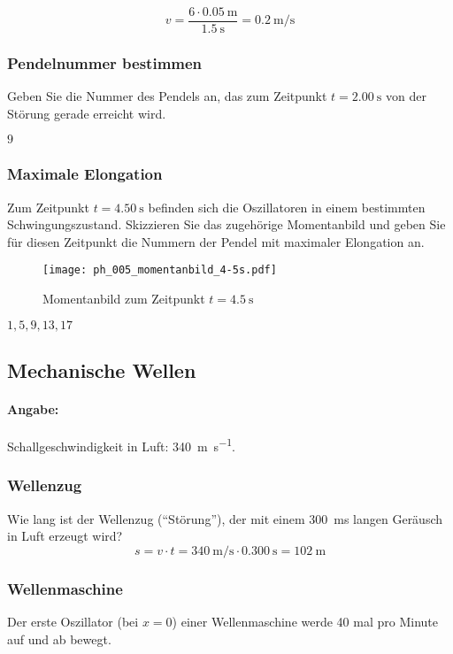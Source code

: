 \documentclass{ajc}
\begin{document}
	\begin{equation}
		v = \frac{6 \cdot \SI{0,05}{\m}}{\SI{1,5}{\s}} = \SI{0,2}{\m\per\s}
	\end{equation}
	
	\subsubsection{Pendelnummer bestimmen}
	Geben Sie die Nummer des Pendels an, das zum Zeitpunkt $t = \SI{2,00}{\second}$ von der Störung gerade erreicht wird.
	
	$9$
	
	\subsubsection{Maximale Elongation}
	Zum Zeitpunkt $t = \SI{4,50}{\second}$ befinden sich die Oszillatoren in einem bestimmten Schwingungszustand. Skizzieren Sie das zugehörige Momentanbild und geben Sie für diesen Zeitpunkt die Nummern der Pendel mit maximaler Elongation an.
	
	\begin{figure}[ht]
		\centering
		\texttt{[image: ph\_005\_momentanbild\_4-5s.pdf]}
		\caption{Momentanbild zum Zeitpunkt $t = \SI{4,5}{\second}$}
		\label{fig:mom_4.5s}
	\end{figure}
	
	$1,5,9,13,17$
	
	\subsection{Mechanische Wellen}
	\paragraph{Angabe:} Schallgeschwindigkeit in Luft: \SI{340}{\m\per\s}.
	
	\subsubsection{Wellenzug}
	Wie lang ist der Wellenzug (\enquote{Störung}), der mit einem \SI{300}{\milli\s} langen Geräusch in Luft erzeugt wird?
	\begin{equation}
		s = v \cdot t = \SI{340}{\m\per\s} \cdot \SI{0,300}{\s} = \SI{102}{\m}
	\end{equation}
	
	\subsubsection{Wellenmaschine}
	Der erste Oszillator (bei $x = 0$) einer Wellenmaschine werde 40 mal pro Minute auf und ab bewegt.
	
\end{document}
